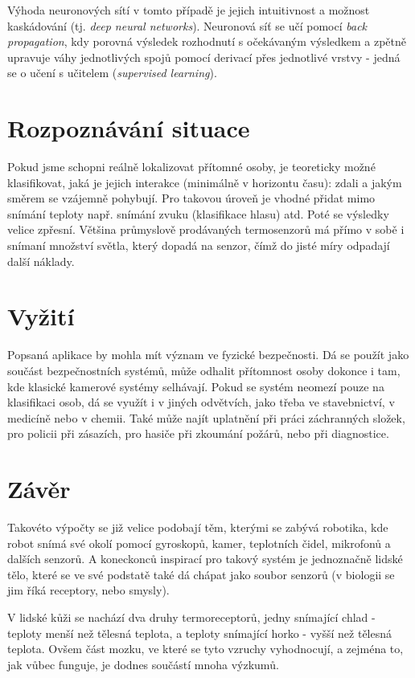   Výhoda neuronových sítí v tomto případě je jejich intuitivnost a možnost kaskádování (tj. {\it
  deep neural networks}). Neuronová síť se učí pomocí {\it back propagation}, kdy porovná výsledek
  rozhodnutí s očekávaným výsledkem a zpětně upravuje váhy jednotlivých spojů pomocí derivací přes
  jednotlivé vrstvy - jedná se o učení s učitelem ({\it supervised learning}).

  \section{Rozpoznávání situace}
  Pokud jsme schopni reálně lokalizovat přítomné osoby, je teoreticky možné klasifikovat, jaká je jejich
  interakce (minimálně v horizontu času): zdali a jakým směrem se vzájemně pohybují. Pro takovou
  úroveň je vhodné přidat mimo snímání teploty např. snímání zvuku (klasifikace hlasu) atd.
  Poté se výsledky velice zpřesní. Většina průmyslově prodávaných termosenzorů má přímo v sobě
  i snímaní množství světla, který dopadá na senzor, čímž do jisté míry odpadají další náklady.
  
  \section{Vyžití}
  Popsaná aplikace by mohla mít význam ve fyzické bezpečnosti. Dá se použít jako součást
  bezpečnostních systémů, může odhalit přítomnost osoby dokonce i tam, kde klasické kamerové
  systémy selhávají. Pokud se systém neomezí pouze na klasifikaci osob, dá se využít i v jiných
  odvětvích, jako třeba ve stavebnictví, v medicíně nebo v chemii. Také může najít uplatnění
  při práci záchranných složek, pro policii při zásazích, pro hasiče při zkoumání požárů,
  nebo při diagnostice.

  \section{Závěr}
  Takovéto výpočty se již velice podobají těm, kterými se zabývá robotika, kde robot snímá své
  okolí pomocí gyroskopů, kamer, teplotních čidel, mikrofonů a dalších senzorů. A koneckonců inspirací
  pro takový systém je jednoznačně lidské tělo, které se ve své podstatě také dá chápat jako soubor
  senzorů (v biologii se jim říká receptory, nebo smysly).
  
  V lidské kůži se nachází dva druhy termoreceptorů, jedny snímající chlad - teploty menší než
  tělesná teplota, a teploty snímající horko - vyšší než tělesná teplota. Ovšem část mozku,
  ve které se tyto vzruchy vyhodnocují, a zejména to, jak vůbec funguje, je dodnes součástí mnoha
  výzkumů.\cite{BodilySenses}

  \newpage
  \printbibliography

